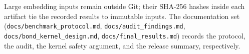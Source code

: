 Large embedding inputs remain outside Git; their SHA-256 hashes inside each
artifact tie the recorded results to immutable inputs. The documentation set
(\texttt{docs/benchmark\_protocol.md}, \texttt{docs/audit\_findings.md},
\texttt{docs/bond\_kernel\_design.md}, \texttt{docs/final\_results.md})
records the protocol, the audit, the kernel safety argument, and the release
summary, respectively.
